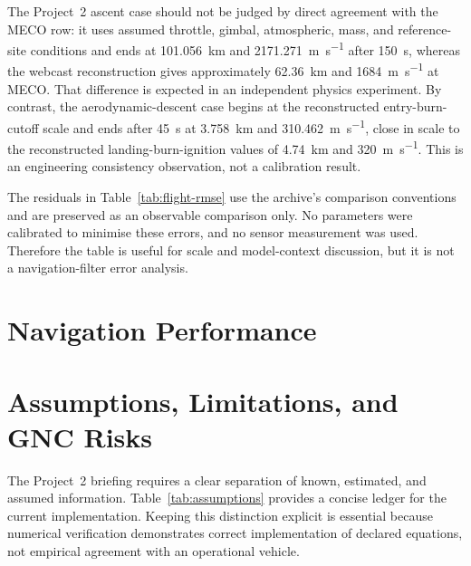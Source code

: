 \documentclass[11pt,letterpaper]{article}
\begin{document}
The Project~2 ascent case should not be judged by direct agreement with the MECO row: it uses assumed throttle, gimbal, atmospheric, mass, and reference-site conditions and ends at \SI{101.056}{\kilo\metre} and \SI{2171.271}{\metre\per\second} after \SI{150}{\second}, whereas the webcast reconstruction gives approximately \SI{62.36}{\kilo\metre} and \SI{1684}{\metre\per\second} at MECO. That difference is expected in an independent physics experiment. By contrast, the aerodynamic-descent case begins at the reconstructed entry-burn-cutoff scale and ends after \SI{45}{\second} at \SI{3.758}{\kilo\metre} and \SI{310.462}{\metre\per\second}, close in scale to the reconstructed landing-burn-ignition values of \SI{4.74}{\kilo\metre} and \SI{320}{\metre\per\second}. This is an engineering consistency observation, not a calibration result.

The residuals in Table~\ref{tab:flight-rmse} use the archive's comparison conventions and are preserved as an observable comparison only. No parameters were calibrated to minimise these errors, and no sensor measurement was used. Therefore the table is useful for scale and model-context discussion, but it is not a navigation-filter error analysis.

\section{Navigation Performance}\label{sec:navigation-performance}


\section{Assumptions, Limitations, and GNC Risks}\label{sec:assumptions}

The Project~2 briefing requires a clear separation of known, estimated, and assumed information. Table~\ref{tab:assumptions} provides a concise ledger for the current implementation. Keeping this distinction explicit is essential because numerical verification demonstrates correct implementation of declared equations, not empirical agreement with an operational vehicle.
\end{document}
